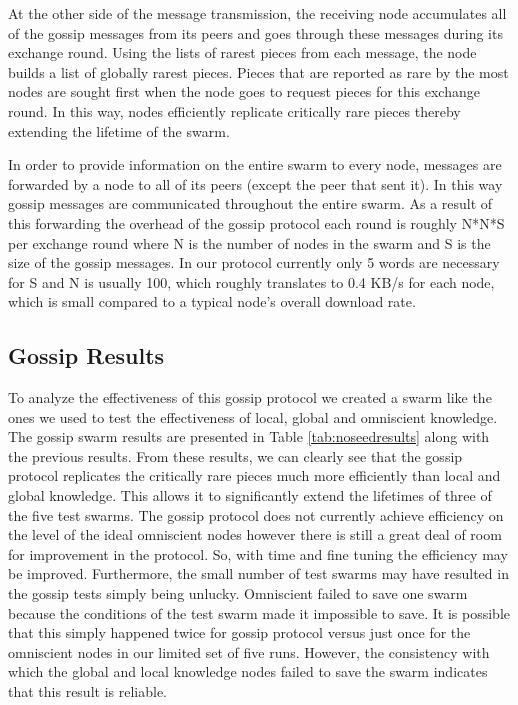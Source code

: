 At the other side of the message transmission, the receiving node
accumulates all of the gossip messages from its peers and goes
through these messages during its exchange round. Using the lists of
rarest pieces from each message, the node builds a list of globally
rarest pieces. Pieces that are reported as rare by the most nodes are
sought first when the node goes to request pieces for this exchange
round. In this way, nodes efficiently replicate critically rare pieces
thereby extending the lifetime of the swarm. 

In order to provide information on the entire swarm to every node,
messages are forwarded by a node to all of its peers (except the peer
that sent it). In this way gossip messages are communicated throughout
the entire swarm. As a result of this forwarding the overhead of the
gossip protocol each round is roughly N*N*S per exchange round where N is the number of
nodes in the swarm and S is the size of the gossip messages. In our protocol
currently only 5 words are necessary for S and N is usually 100, which
roughly translates to 0.4 KB/s for each node, which is small compared to
a typical node's overall download rate.

\subsection{Gossip Results}

To analyze the effectiveness of this gossip protocol we created a
swarm like the ones we used to test the effectiveness of local, global
and omniscient knowledge. The gossip swarm results are presented in
Table \ref{tab:noseedresults} along with the previous results. From these results, we can clearly see that the gossip
protocol replicates the critically rare pieces much more efficiently
than local and global knowledge. This allows it to significantly extend the
lifetimes of three of the five test swarms. The gossip protocol does
not currently achieve efficiency on the level of the ideal omniscient
nodes however there is still a great deal of room for improvement
in the protocol. So, with time and fine tuning the efficiency may be
improved. Furthermore, the small number of test swarms may have
resulted in the gossip tests simply being unlucky. Omniscient failed
to save one swarm because the conditions of the test swarm made it
impossible to save. It is possible that this simply happened twice for
gossip protocol versus just once for the omniscient nodes in our
limited set of five runs. However, the consistency with which the
global and local knowledge nodes failed to save the swarm indicates
that this result is reliable.

